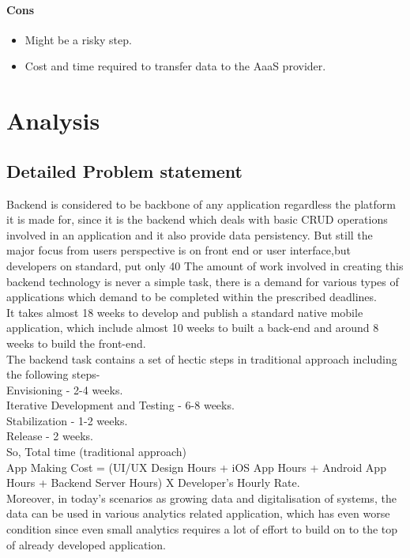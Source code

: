 \documentclass[a4paper,12pt]{report}
\begin{document}
    \subsubsection{Cons}
    \begin{itemize}
      \item Might be a risky step.
      \item Cost and time required to transfer data to the AaaS provider.      
    \end{itemize}

    \chapter {Analysis}
    \section{Detailed Problem statement}
    \label{sec:theory}
    Backend is considered to be backbone of any application regardless the platform it is made for, since it is the backend which deals with basic CRUD operations involved in an application and it also provide data persistency. But still the major focus from users perspective is on front end or user interface,but developers on standard, put only 40%
    The amount of work involved in creating this backend technology is never a simple task, there is a demand for various types of applications which demand to be completed within the prescribed deadlines. \\
    It takes almost 18 weeks to develop and publish a standard native mobile application, which include almost 10 weeks to built a back-end and around 8 weeks to build the front-end.\\
    The backend task contains a set of hectic steps in traditional approach including the following steps-\\
    Envisioning - 2-4 weeks.\\
    Iterative Development and Testing - 6-8 weeks.\\
    Stabilization - 1-2 weeks.\\
    Release - 2 weeks.\\
    So, Total time (traditional approach) \\
    App Making Cost = (UI/UX Design Hours + iOS App Hours + Android App Hours + Backend Server Hours) X Developer’s Hourly Rate.\\    
    Moreover, in today’s scenarios as growing data and digitalisation of systems, the data can be used in various analytics related application, which has even worse condition since even small analytics requires a lot of effort to build on to the top of already developed application.\\    
\end{document}
